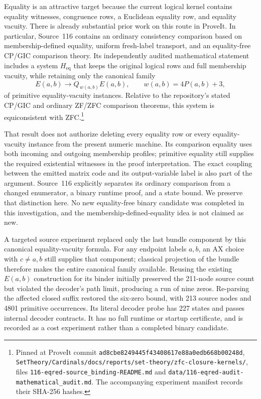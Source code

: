 Equality is an attractive target because the current logical kernel
contains equality witnesses, congruence rows, a Euclidean equality row,
and equality vacuity.  There is already substantial prior work on this
route in ProveIt.  In particular, Source~116 contains an ordinary
consistency comparison based on membership-defined equality, uniform
fresh-label transport, and an equality-free CP/GIC comparison theory.
Its independently audited mathematical statement includes a system
$H_{\mathrm{eq}}$ that keeps the original logical rows and full
membership vacuity, while retaining only the canonical family
\[
 E(a,b)\longrightarrow Q_{\,w(a,b)}E(a,b),
 \qquad w(a,b)=4P(a,b)+3,
\]
of primitive equality-vacuity instances.  Relative to the repository's
stated CP/GIC and ordinary ZF/ZFC comparison theorems, this system is
equiconsistent with ZFC.\footnote{Pinned at ProveIt commit
\nolinkurl{ad8cbe8249445f43408617e88a0edb668b00248d},
\nolinkurl{SetTheory/Cardinals/docs/reports/set-theory/zfc-closure-kernels/},
files \texttt{116-eqred-source\_binding-README.md} and
\texttt{data/116-eqred-audit-mathematical\_audit.md}.
The accompanying experiment manifest records their SHA-256 hashes.}

That result does not authorize deleting every equality row or every
equality-vacuity instance from the present numeric machine.  Its
comparison equality uses both incoming and outgoing membership
profiles; primitive equality still supplies the required existential
witnesses in the proof interpretation.  The exact coupling between
the emitted matrix code and its output-variable label is also part of
the argument.  Source~116 explicitly separates its ordinary comparison
from a changed enumerator, a binary runtime proof, and a state bound.
We preserve that distinction here.  No new equality-free binary
candidate was completed in this investigation, and the
membership-defined-equality idea is not claimed as new.

A targeted source experiment replaced only the last bundle component
by this canonical equality-vacuity formula.  For any endpoint labels
$a,b$, an AX choice with $c\ne a,b$ still supplies that component;
classical projection of the bundle therefore makes the entire
canonical family available.  Reusing the existing $E(a,b)$ construction
for its binder initially preserved the 211-node source count but
violated the decoder's path limit, producing a run of nine zeros.
Re-parsing the affected closed suffix restored the six-zero bound,
with 213 source nodes and 4801 primitive occurrences.  Its literal
decoder probe has 227 states and passes internal decoder contracts.
It has no full runtime or startup certificate, and is recorded as a
cost experiment rather than a completed binary candidate.

